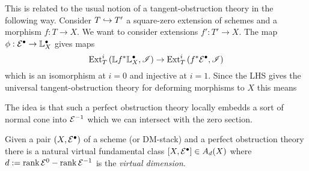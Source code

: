 \documentclass[12pt]{article}
\begin{document}
\begin{rmk}
This is related to the usual notion of a tangent-obstruction theory in the following way. Consider $T \hookrightarrow T'$ a square-zero extension of schemes and a morphism $f : T \to X$. We want to consider extensions $f' : T' \to X$. The map $\phi : \mathcal{E}^\bullet \to \mathbb{L}_X^\bullet$ gives maps
\[ \mathrm{Ext}^{i}_{T} \left( \mathbb{L} f^* \mathbb{L}_X^\bullet, \mathscr{I} \right) \to \mathrm{Ext}^{i}_{T} \left( f^* \mathcal{E}^\bullet, \mathscr{I} \right) \]
which is an isomorphism at $i = 0$ and injective at $i = 1$. Since the LHS gives the universal tangent-obstruction theory for deforming morphisms to $X$ this means 
\end{rmk}

The idea is that such a perfect obstruction theory locally embedds a sort of normal cone  into $\mathcal{E}^{-1}$ which we can intersect with the zero section. 

\begin{theorem}
Given a pair $(X, \mathcal{E}^\bullet)$ of a scheme (or DM-stack) and a perfect obstruction theory there is a natural virtual fundamental class $[X, \mathcal{E}^\bullet] \in A_d(X)$ where $d := \operatorname{\mathrm{rank}}{\mathcal{E}^0} - \operatorname{\mathrm{rank}}{\mathcal{E}^{-1}}$ is the \textit{virtual dimension}.  
\end{theorem}
\end{document}
